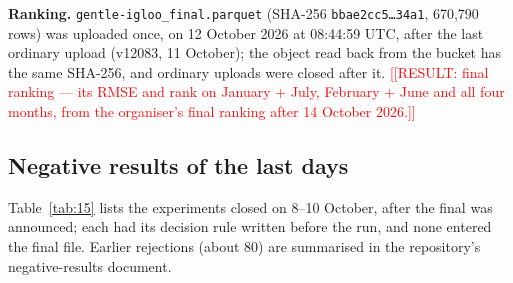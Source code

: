 \documentclass[
  manuscript=article,  %
  layout=preprint,     %
  year=2026,
  volume=4,
]{extra/joas}
\newcommand{\placeholder}[1]{\textcolor{red}{[[RESULT:#1]]}}
\begin{document}
\textbf{Ranking.} \texttt{gentle-igloo\_\allowbreak{}final.parquet} (SHA-256 \texttt{bbae2cc5\ldots{}34a1}, 670,790 rows) was uploaded once, on 12 October 2026 at 08:44:59 UTC, after the last ordinary upload (v12083, 11 October); the object read back from the bucket has the same SHA-256, and ordinary uploads were closed after it. \placeholder{ final ranking --- its RMSE and rank on January + July, February + June and all four months, from the organiser's final ranking after 14 October 2026.}

\subsection{Negative results of the last days}\label{negative-results-of-the-last-days}

Table~\ref{tab:15} lists the experiments closed on 8--10 October, after the final was announced; each had its decision rule written before the run, and none entered the final file. Earlier rejections (about 80) are summarised in the repository's negative-results document.
\end{document}

